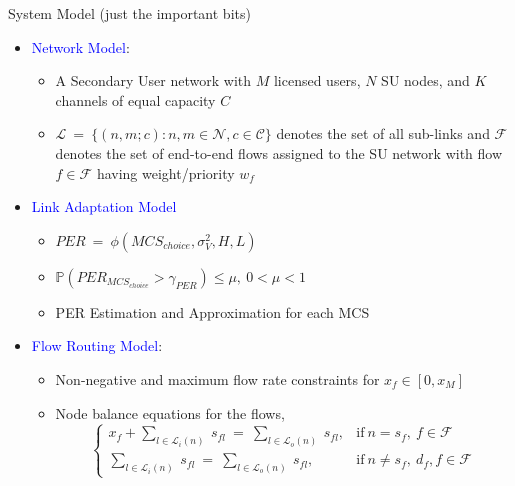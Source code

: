 \documentclass{beamer}
\begin{document}
\begin{frame}{System Model (just the important bits)}
\begin{itemize}
    \item \textcolor{blue}{Network Model}:
    \begin{itemize}
        \item A Secondary User network with $M$ licensed users, $N$ SU nodes, and $K$ channels of equal capacity $C$
        \item $\mathcal{L}\ =\ \{(n,m;c): n,m \in \mathcal{N}, c \in \mathcal{C}\}$ denotes the set of all sub-links and $\mathcal{F}$ denotes the set of end-to-end flows assigned to the SU network with flow $f \in \mathcal{F}$ having weight/priority $w_f$
    \end{itemize}
    \item \textcolor{blue}{Link Adaptation Model}
    \begin{itemize}
        \item $PER\ =\ \phi(MCS_{choice}, \sigma_V^2, H, L)$
        \item $\mathbb{P}(PER_{MCS_{choice}} > \gamma_{PER}) \leq \mu,\ 0 < \mu < 1$
        \item PER Estimation and Approximation for each MCS
    \end{itemize}
    \item \textcolor{blue}{Flow Routing Model}:
    \begin{itemize}
        \item Non-negative and maximum flow rate constraints for $x_f \in [0,x_M]$
        \item Node balance equations for the flows,
        \begin{equation*}
            \begin{cases}
                x_f + \sum_{l \in \mathcal{L}_i(n)}\ s_{fl}\ =\ \sum_{l \in \mathcal{L}_o(n)}\ s_{fl}, & \text{if}\ n=s_{f},\ f \in \mathcal{F}\\
                \sum_{l \in \mathcal{L}_i(n)}\ s_{fl}\ =\ \sum_{l \in \mathcal{L}_o(n)}\ s_{fl}, & \text{if}\ n\not=s_{f},\ d_f, f \in \mathcal{F}
            \end{cases}
        \end{equation*}
    \end{itemize}
\end{itemize}
\vskip 1cm
\end{frame}
\end{document}
